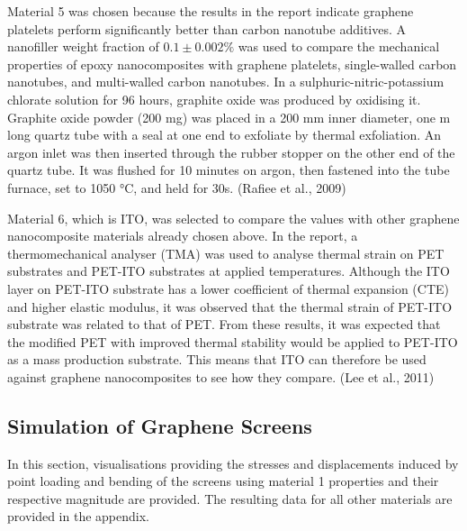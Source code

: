 \documentclass[a4paper,12pt]{article}
\numberwithin{equation}{section}
\numberwithin{figure}{section}
\begin{document}
\noindent Material 5 was chosen because the results in the report indicate graphene platelets perform significantly better than carbon nanotube additives. A nanofiller weight fraction of ${0.1}\pm{0.002\%}$ was used to compare the mechanical properties of epoxy nanocomposites with graphene platelets, single-walled carbon nanotubes, and multi-walled carbon nanotubes. In a sulphuric-nitric-potassium chlorate solution for 96 hours, graphite oxide was produced by oxidising it. Graphite oxide powder (200 mg) was placed in a 200 mm inner diameter, one m long quartz tube with a seal at one end to exfoliate by thermal exfoliation. An argon inlet was then inserted through the rubber stopper on the other end of the quartz tube. It was flushed for 10 minutes on argon, then fastened into the tube furnace, set to 1050 °C, and held for 30s. (Rafiee et al., 2009)
\vspace{\baselineskip}

\noindent Material 6, which is ITO, was selected to compare the values with other graphene nanocomposite materials already chosen above. In the report, a thermomechanical analyser (TMA) was used to analyse thermal strain on PET substrates and PET-ITO substrates at applied temperatures. Although the ITO layer on PET-ITO substrate has a lower coefficient of thermal expansion (CTE) and higher elastic modulus, it was observed that the thermal strain of PET-ITO substrate was related to that of PET. From these results, it was expected that the modified PET with improved thermal stability would be applied to PET-ITO as a mass production substrate. This means that ITO can therefore be used against graphene nanocomposites to see how they compare. (Lee et al., 2011)

\subsection{Simulation of Graphene Screens}

\noindent In this section, visualisations providing the stresses and displacements induced by point loading and bending of the screens using material 1 properties and their respective magnitude are provided. The resulting data for all other materials are provided in the appendix.\vspace{\baselineskip}
\end{document}
